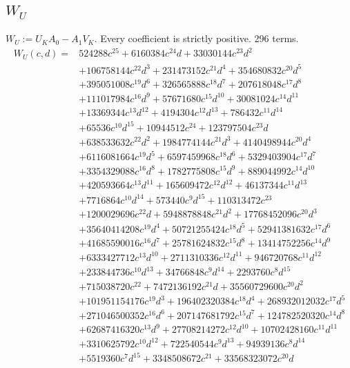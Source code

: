 \subsection*{$W_U$}
$W_U:=U_KA_0-A_1V_K$. Every coefficient is strictly positive. 296 terms.
{\small
\begin{align*}
W_U(c,d)={}&524288c^{25}+6160384c^{24}d+33030144c^{23}d^{2}\\
&+106758144c^{22}d^{3}+231473152c^{21}d^{4}+354680832c^{20}d^{5}\\
&+395051008c^{19}d^{6}+326565888c^{18}d^{7}+207618048c^{17}d^{8}\\
&+111017984c^{16}d^{9}+57671680c^{15}d^{10}+30081024c^{14}d^{11}\\
&+13369344c^{13}d^{12}+4194304c^{12}d^{13}+786432c^{11}d^{14}\\
&+65536c^{10}d^{15}+10944512c^{24}+123797504c^{23}d\\
&+638533632c^{22}d^{2}+1984774144c^{21}d^{3}+4140498944c^{20}d^{4}\\
&+6116081664c^{19}d^{5}+6597459968c^{18}d^{6}+5329403904c^{17}d^{7}\\
&+3354329088c^{16}d^{8}+1782775808c^{15}d^{9}+889044992c^{14}d^{10}\\
&+420593664c^{13}d^{11}+165609472c^{12}d^{12}+46137344c^{11}d^{13}\\
&+7716864c^{10}d^{14}+573440c^{9}d^{15}+110313472c^{23}\\
&+1200029696c^{22}d+5948878848c^{21}d^{2}+17768452096c^{20}d^{3}\\
&+35640414208c^{19}d^{4}+50721255424c^{18}d^{5}+52941381632c^{17}d^{6}\\
&+41685590016c^{16}d^{7}+25781624832c^{15}d^{8}+13414752256c^{14}d^{9}\\
&+6333427712c^{13}d^{10}+2711310336c^{12}d^{11}+946720768c^{11}d^{12}\\
&+233844736c^{10}d^{13}+34766848c^{9}d^{14}+2293760c^{8}d^{15}\\
&+715038720c^{22}+7472136192c^{21}d+35560729600c^{20}d^{2}\\
&+101951154176c^{19}d^{3}+196402320384c^{18}d^{4}+268932012032c^{17}d^{5}\\
&+271046500352c^{16}d^{6}+207147681792c^{15}d^{7}+124782520320c^{14}d^{8}\\
&+62687416320c^{13}d^{9}+27708214272c^{12}d^{10}+10702428160c^{11}d^{11}\\
&+3310625792c^{10}d^{12}+722540544c^{9}d^{13}+94939136c^{8}d^{14}\\
&+5519360c^{7}d^{15}+3348508672c^{21}+33568323072c^{20}d\\

\end{align*}}
